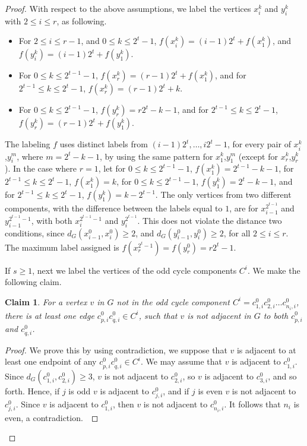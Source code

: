 \documentclass{article}
\newtheorem{claim} {Claim}
\newtheorem{open problem} {Open Problem}
\numberwithin{lemma}{section}
\numberwithin{theorem}{section}
\numberwithin{cor}{section}
\numberwithin{prop}{section}
\numberwithin{con}{section}
\numberwithin{claim}{section}
\numberwithin{obs}{section}
\numberwithin{dnt}{section}
\begin{document}
\begin{proof}
	With respect to the above assumptions, we label the vertices $x^k_i$ and $y^k_i$ with $2\leq i\leq r$, as following.
	\begin{itemize}
		\item  For $2\leq i\leq r-1$, and $0\leq k\leq 2^t-1$, $f(x^k_i)=(i-1)2^t+f(x^k_1)$, and $f(y^k_i)=(i-1)2^t+f(y^k_1)$. 
		\item For $0\leq k\leq 2^{t-1}-1$, $f(x^k_r)=(r-1)2^t+f(x^k_1)$, and for $2^{t-1}\leq k\leq 2^t-1$, $f(x^k_r)=(r-1)2^t+k$. 
		\item For $0\leq k\leq 2^{t-1}-1$, $f(y^k_r)=r2^t-k-1$, and for  $2^{t-1}\leq k\leq 2^t-1$, $f(y^k_r)=(r-1)2^t+f(y^k_1)$.
	\end{itemize} 
	\par 
	The labeling $f$ uses distinct labels from $(i-1)2^t,\ldots, i2^t-1$, for every pair of $x^k_i$,$y^m_i$, where $m=2^t-k-1$,  by using the same pattern for $x^k_1$,$y^m_1$ (except for $x^k_r$,$y^k_r$). In the case where $r=1$, let for $0\leq k \leq 2^{t-1}-1$, $f(x^k_1)=2^{t-1}-k-1$, for $2^{t-1}\leq k\leq 2^t-1$, $f(x^k_1)=k$,  for $0\leq k\leq 2^{t-1}-1$, $f(y^k_1)=2^t-k-1$, and for $2^{t-1}\leq k \leq 2^t-1$,  $f(y^k_1)=k-2^{t-1}$.  The only vertices from two different components, with the difference between the labels equal to $1$, are for $x^{2^{t-1}}_{i-1}$ and $y^{2^{t-1}-1}_{i-1}$, with both $x^{2^{t-1}-1}_i$ and $y^{2^{t-1}}_i$. This does not violate the distance two conditions, since $d_G(x^0_{i-1},x^0_i)\geq 2$, and $d_G(y^0_{i-1},y^0_i)\geq 2$, for all $2\leq i\leq r$.
	The maximum label assigned is $f(x^{2^t-1}_r)=f(y^0_r)=r2^t-1$.\par
	If $s\geq 1$, next we label the vertices of the odd cycle components $C^i$.
	We make the following claim.
	\begin{claim}
		For a vertex $v$ in $G$ not in the odd cycle component $C^i=c^0_{1,i}c^0_{2,i}\ldots c^0_{n_i,i}$, there is at least one edge  $c^0_{p,i}c^0_{q,i}\in C^i$, such that $v$ is not adjacent in $G$ to both $c^0_{p,i}$ and $c^0_{q,i}$.
	\end{claim}
	\begin{proof}
		We prove this by using contradiction, we suppose that $v$ is adjacent to at least one endpoint of any $c^0_{p,i}c^0_{q,i}\in C^i$. We may assume that $v$ is adjacent to $c^0_{1,i}$. Since $d_G(c^0_{1,i},c^0_{2,i})\geq 3$, $v$ is not adjacent to $c^0_{2,i}$, so $v$ is adjacent to $c^0_{3,i}$, and so forth. Hence, if $j$ is odd $v$ is adjacent to  $c^0_{j,i}$, and if $j$ is even $v$ is not adjacent to $c^0_{j,i}$. Since $v$ is adjacent to $c^0_{1,i}$, then $v$ is not adjacent to $c^0_{n_i,i}$. It follows that $n_i$ is even, a contradiction.~\end{proof}

\end{proof}
\end{document}
